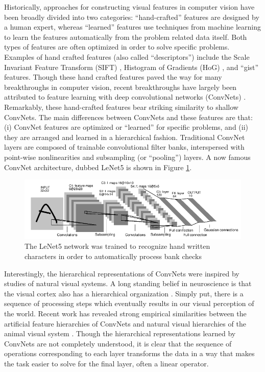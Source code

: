 Historically, approaches for constructing visual features in computer vision
have been broadly divided into two categories: ``hand-crafted'' features are
designed by a human expert, whereas ``learned'' features use techniques from
machine learning to learn the features automatically from the problem related
data itself. Both types of features are often optimized in order to solve
specific problems. Examples of hand crafted features (also called
``descriptors'') include the Scale Invariant Feature Transform (SIFT)
\cite{SIFT}, Histogram of Gradients (HoG) \cite{HoG}, and ``gist'' \cite{gist}
features. Though these hand crafted features paved the way for many
breakthroughs in computer vision, recent breakthroughs have largely been
attributed to feature learning with deep convolutional networks (ConvNets)
\cite{fukushima1980, LeCun1998, ImageNet}.  Remarkably, these hand-crafted
features bear striking similarity to shallow ConvNets. The main differences
between ConvNets and these features are that: (i) ConvNet features are
optimized or ``learned'' for specific problems, and (ii) they are arranged and
learned in a hierarchical fashion. Traditional ConvNet layers are composed of
trainable convolutional filter banks, interspersed with point-wise
nonlinearities and subsampling (or ``pooling'') layers.  A now famous ConvNet
architecture, dubbed LeNet5 \cite{LeCun1998} is shown in Figure \ref{fig:LeNet5}.       

\begin{figure} 
\centering
\includegraphics[scale=0.5]{./figures/introduction/lenet5.png} 
\caption{The LeNet5 network was trained to recognize hand written characters in order to 
automatically process bank checks} 
\label{fig:LeNet5} 
\end{figure}  

Interestingly, the hierarchical representations of ConvNets were inspired by
studies of natural visual systems. A long standing belief in neuroscience is
that the visual cortex also has a hierarchical organization
\cite{hubel1968,felleman1991}. Simply put, there is a sequence of processing
steps which eventually results in our visual perception of the world. Recent
work has revealed strong empirical similarities between the artificial feature
hierarchies of ConvNets and natural visual hierarchies of the animal visual
system \cite{yamins2014}. Though the hierarchical representations learned by
ConvNets are not completely understood, it is clear that the sequence of
operations corresponding to each layer transforms the data in a way that makes
the task easier to solve for the final layer, often a linear operator.    

